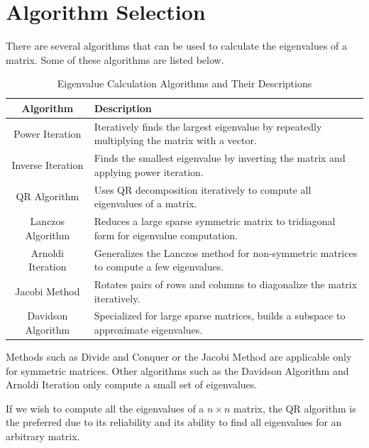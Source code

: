\documentclass{article}
\begin{document}
\section{Algorithm Selection}

There are several algorithms that can be used to calculate the eigenvalues of a matrix.
Some of these algorithms are listed below.

\begin{table}[h!]
    \centering
    \begin{tabular}{|c|p{6cm}|}
    \hline
    \textbf{Algorithm}        & \textbf{Description} \\
    \hline
    Power Iteration           & Iteratively finds the largest eigenvalue by repeatedly multiplying the matrix with a vector. \\
    \hline
    Inverse Iteration         & Finds the smallest eigenvalue by inverting the matrix and applying power iteration. \\
    \hline
    QR Algorithm              & Uses QR decomposition iteratively to compute all eigenvalues of a matrix. \\
    \hline
    Lanczos Algorithm         & Reduces a large sparse symmetric matrix to tridiagonal form for eigenvalue computation. \\
    \hline
    Arnoldi Iteration         & Generalizes the Lanczos method for non-symmetric matrices to compute a few eigenvalues. \\
    \hline
    Jacobi Method             & Rotates pairs of rows and columns to diagonalize the matrix iteratively. \\
    \hline
    Davidson Algorithm        & Specialized for large sparse matrices, builds a subspace to approximate eigenvalues. \\
    \hline
    \end{tabular}
    \caption{Eigenvalue Calculation Algorithms and Their Descriptions}
    \label{tab:eigenvalue_algorithms}
\end{table}
    
Methods such as Divide and Conquer or the Jacobi Method are applicable only for symmetric
matrices. Other algorithms such as the Davidson Algorithm and Arnoldi Iteration only compute a
small set of eigenvalues.

If we wish to compute all the eigenvalues of a $n \times n$ matrix, the
QR algorithm is the preferred due to its reliability and its ability
to find all eigenvalues for an arbitrary matrix.
\end{document}
